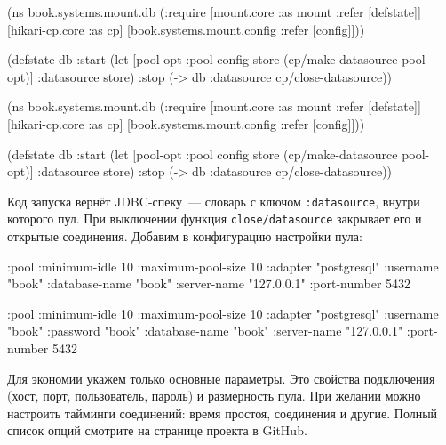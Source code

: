 \ifnarrow

\begin{clojure}
(ns book.systems.mount.db
  (:require
   [mount.core :as mount
    :refer [defstate]]
   [hikari-cp.core :as cp]
   [book.systems.mount.config
    :refer [config]]))

(defstate db
  :start
  (let [{pool-opt :pool} config
        store (cp/make-datasource
                pool-opt)]
    {:datasource store})
  :stop
  (-> db
      :datasource
      cp/close-datasource))
\end{clojure}

\else

\begin{clojure}
(ns book.systems.mount.db
  (:require
   [mount.core :as mount :refer [defstate]]
   [hikari-cp.core :as cp]
   [book.systems.mount.config :refer [config]]))

(defstate db
  :start
  (let [{pool-opt :pool} config
        store (cp/make-datasource pool-opt)]
    {:datasource store})
  :stop
  (-> db :datasource cp/close-datasource))
\end{clojure}

\fi


Код запуска вернёт JDBC-спеку~--- словарь с ключом \texttt{:data\-sour\-ce},
внутри которого пул. При выключении функция \texttt{close\-/datasource} закрывает
его и открытые соединения. Добавим в конфигурацию настройки пула:

\ifafive

\begin{clojure}
{:pool {:minimum-idle       10
        :maximum-pool-size  10
        :adapter            "postgresql"
        :username           "book"
        :database-name      "book"
        :server-name        "127.0.0.1"
        :port-number        5432}}
\end{clojure}

\else

\begin{clojure}
{:pool {:minimum-idle       10
        :maximum-pool-size  10
        :adapter            "postgresql"
        :username           "book"
        :password           "book"
        :database-name      "book"
        :server-name        "127.0.0.1"
        :port-number        5432}}
\end{clojure}

\fi

Для экономии укажем только основные параметры. Это свойства подключения (хост,
порт, пользователь, пароль) и размерность пула. При желании можно настроить
тайминги соединений: время простоя, соединения и другие. Полный список опций
смотрите на странице проекта в GitHub.

